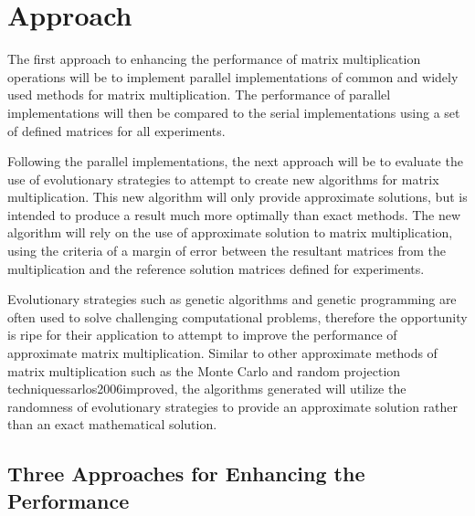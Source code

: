 \documentclass{article}
\begin{document}
\section{Approach}

The first approach to enhancing the performance of matrix multiplication operations will be to implement parallel implementations of common and widely used methods for matrix multiplication. The performance of parallel implementations will then be compared to the serial implementations using a set of defined matrices for all experiments.

Following the parallel implementations, the next approach will be to evaluate the use of evolutionary strategies to attempt to create new algorithms for matrix multiplication. This new algorithm will only provide approximate solutions, but is intended to produce a result much more optimally than exact methods. The new algorithm will rely on the use of approximate solution to matrix multiplication, using the criteria of a margin of error between the resultant matrices from the multiplication and the reference solution matrices defined for experiments.

Evolutionary strategies such as genetic algorithms and genetic programming are often used to solve challenging computational problems\cite{de1989using}, therefore the opportunity is ripe for their application to attempt to improve the performance of approximate matrix multiplication. Similar to other approximate methods of matrix multiplication such as the Monte Carlo\cite{drineas2006fastI, drineas2001fast} and random projection techniques{sarlos2006improved}, the algorithms generated will utilize the randomness of evolutionary strategies to provide an approximate solution rather than an exact mathematical solution.\\



\subsection{Three Approaches for Enhancing the Performance}
\end{document}
